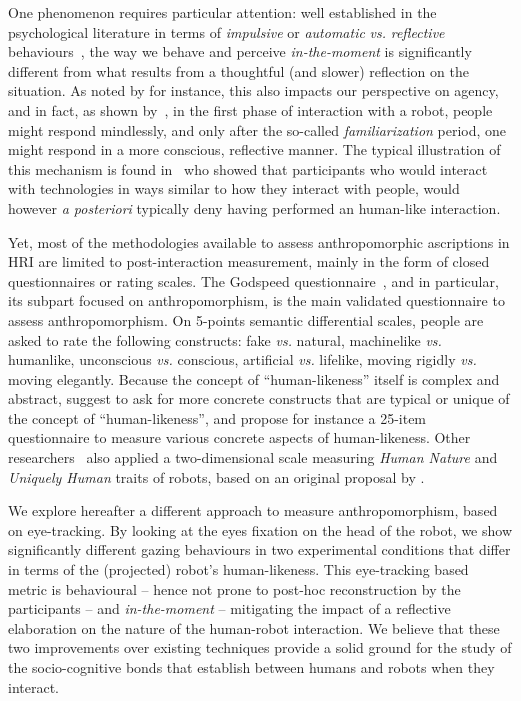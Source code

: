 \documentclass[lettersize, noapacite, twoside, HRI]{apa_HRI}
\newcommand{\vs}{\textit{vs.}\xspace}
\begin{document}
One phenomenon requires particular attention: well established in the
psychological literature in terms of \emph{impulsive} or \emph{automatic} \vs
\emph{reflective} behaviours~\citep{strack2004reflective}, the way we behave and
perceive \emph{in-the-moment} is significantly different from what results from
a thoughtful (and slower) reflection on the situation. As noted by
\citet{takayama_perspectives_2012} for instance, this also impacts our
perspective on agency, and in fact, as shown by~\citet{nass_machines_2000}, in
the first phase of interaction with a robot, people might respond mindlessly,
and only after the so-called \emph{familiarization} period, one might respond in
a more conscious, reflective manner. The typical illustration of this mechanism
is found in~\citet{reeves_media_1996} who showed that participants who would
interact with technologies in ways similar to how they interact with people,
would however {\it a posteriori} typically deny having performed an human-like
interaction.

Yet, most of the methodologies available to assess anthropomorphic ascriptions
in HRI are limited to post-interaction measurement, mainly in the form of closed
questionnaires or rating scales. The Godspeed
questionnaire~\citep{bartneck_measurement_2008}, and in particular, its subpart
focused on anthropomorphism, is the main validated questionnaire to assess
anthropomorphism. On 5-points semantic differential scales, people are asked to
rate the following constructs: fake \vs natural, machinelike \vs humanlike,
unconscious \vs conscious, artificial \vs lifelike, moving rigidly \vs moving
elegantly. Because the concept of ``human-likeness'' itself is complex and
abstract, \citet{kahn_jr._robotic_2006} suggest to ask for more concrete
constructs that are typical or unique of the concept of ``human-likeness'', and
\citet{ruijten_introducing_2014} propose for instance a 25-item questionnaire to
measure various concrete aspects of human-likeness. Other
researchers~\citep{zlotowski2014dimensions,salem2015would} also applied a
two-dimensional scale measuring \emph{Human Nature} and \emph{Uniquely Human}
traits of robots, based on an original proposal by
\citet{haslam2008attributing}.

We explore hereafter a different approach to measure anthropomorphism, based on
eye-tracking. By looking at the eyes fixation on the head of the robot, we show
significantly different gazing behaviours in two experimental conditions that
differ in terms of the (projected) robot's human-likeness. This eye-tracking
based metric is behavioural -- hence not prone to post-hoc reconstruction by the
participants -- and \emph{in-the-moment} -- mitigating the impact of a reflective
elaboration on the nature of the human-robot interaction. We believe that these
two improvements over existing techniques provide a solid ground for the study
of the socio-cognitive bonds that establish between humans and robots when they
interact.
\end{document}
